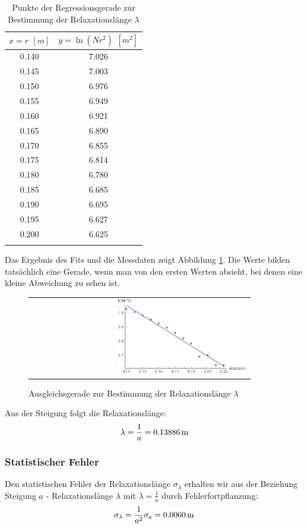 \documentclass[a4paper,titlepage]{scrartcl}
\numberwithin{equation}{section}
\begin{document}
\begin{longtable}[H]{c|c}
$x=r$ $[m]$ & $y=\ln{(N r^2)}$ $[m^2]$ \\
\hline
0.140 & 7.026\\
0.145 & 7.003\\
0.150 & 6.976\\
0.155 & 6.949\\
0.160 & 6.921\\
0.165 & 6.890\\
0.170 & 6.855\\
0.175 & 6.814\\
0.180 & 6.780\\
0.185 & 6.685\\
0.190 & 6.695\\
0.195 & 6.627\\
0.200 & 6.625\\
\caption{Punkte der Regressionsgerade zur Bestimmung der Relaxationslänge $\lambda$}
\label{tab:regressionRelaxation}
\end{longtable}
Das Ergebnis des Fits und die Messdaten zeigt Abbildung \ref{fig:relaxationsGerade}. Die Werte bilden tatsächlich eine Gerade, wenn man von den ersten Werten absieht, bei denen eine kleine Abweichung zu sehen ist. 
\begin{figure}[H]
	\centering
	\begin{tabular}{@{}r@{}}
		\includegraphics[width=0.6\textwidth]{relaxation.png}
	\end{tabular}
	\caption{Ausgleichsgerade zur Bestimmung der Relaxationslänge $\lambda$}
    \label{fig:relaxationsGerade}
\end{figure}
Aus der Steigung folgt die Relaxationslänge:
\begin{equation*}
\lambda = \frac{1}{a} = \unit[0.13886]{m}
\end{equation*}

\subsubsection{Statistischer Fehler}
Den statistischen Fehler der Relaxationslänge $\sigma_{\lambda}$ erhalten wir aus der Beziehung Steigung $a$ - Relaxationslänge $\lambda$ mit $\lambda=\frac{1}{a}$ durch Fehlerfortpflanzung:
\begin{equation*}
\sigma_{\lambda}=\frac{1}{a^2}\sigma_a=\unit[0.0060]{m}
\end{equation*}
\end{document}
